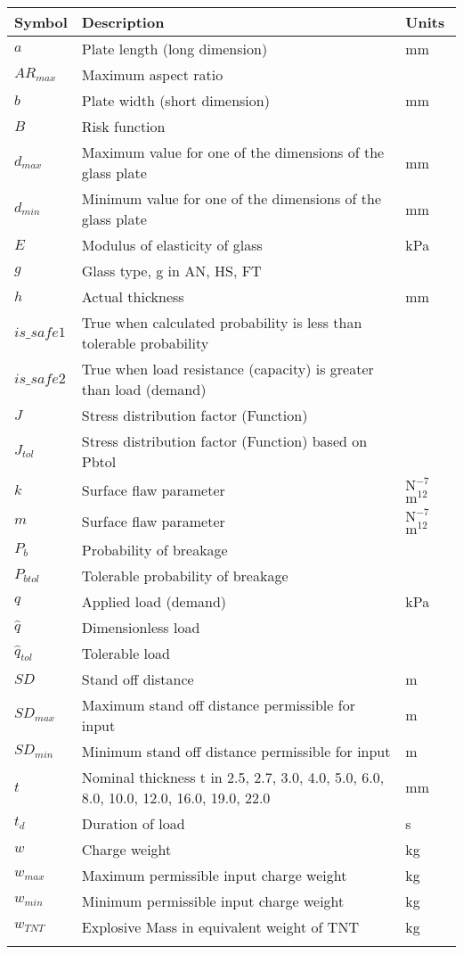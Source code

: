 \documentclass[12pt]{article}
\begin{document}
\begin{longtable*}{l l l}
\toprule
Symbol & Description & Units
\\
\midrule
$a$ & Plate length (long dimension) & mm
\\
$AR_{max}$ & Maximum aspect ratio & 
\\
$b$ & Plate width (short dimension) & mm
\\
$B$ & Risk function & 
\\
$d_{max}$ & Maximum value for one of the dimensions of the glass plate & mm
\\
$d_{min}$ & Minimum value for one of the dimensions of the glass plate & mm
\\
$E$ & Modulus of elasticity of glass & kPa
\\
$g$ & Glass type, g in {AN, HS, FT} & 
\\
$h$ & Actual thickness & mm
\\
$is\_safe1$ & True when calculated probability is less than tolerable probability & 
\\
$is\_safe2$ & True when load resistance (capacity) is greater than load (demand) & 
\\
$J$ & Stress distribution factor (Function) & 
\\
$J_{tol}$ & Stress distribution factor (Function) based on Pbtol & 
\\
$k$ & Surface flaw parameter & $\text{N}^{-7}$$\text{m}^{12}$
\\
$m$ & Surface flaw parameter & $\text{N}^{-7}$$\text{m}^{12}$
\\
$P_{b}$ & Probability of breakage & 
\\
$P_{btol}$ & Tolerable probability of breakage & 
\\
$q$ & Applied load (demand) & kPa
\\
$\hat{q}$ & Dimensionless load & 
\\
$\hat{q}_{tol}$ & Tolerable load & 
\\
$SD$ & Stand off distance & m
\\
$SD_{max}$ & Maximum stand off distance permissible for input & m
\\
$SD_{min}$ & Minimum stand off distance permissible for input & m
\\
$t$ & Nominal thickness t in {2.5, 2.7, 3.0, 4.0, 5.0, 6.0, 8.0, 10.0, 12.0, 16.0, 19.0, 22.0} & mm
\\
$t_{d}$ & Duration of load & s
\\
$w$ & Charge weight & kg
\\
$w_{max}$ & Maximum permissible input charge weight & kg
\\
$w_{min}$ & Minimum permissible input charge weight & kg
\\
$w_{TNT}$ & Explosive Mass in equivalent weight of TNT & kg
\\
\bottomrule
\label{Table:ToS}
\end{longtable*}
\end{document}
